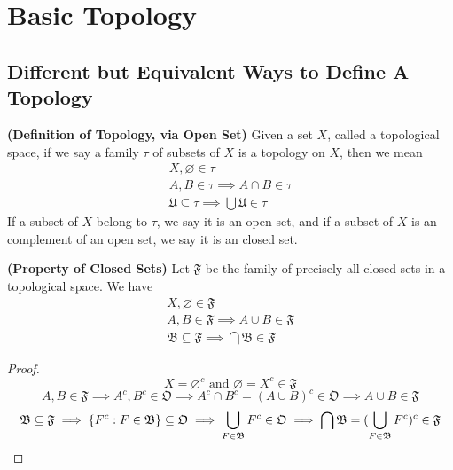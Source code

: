 \documentclass{report}
\begin{document}
\chapter{Basic Topology} 
\section{Different but Equivalent Ways to Define A Topology}
\begin{definition}
\label{2.1.1}
\textbf{(Definition of Topology, via Open Set)} Given a set $X$, called a topological space, if we say a family $\tau$  of subsets of $X$ is a topology on $X$, then we mean
\begin{gather}
X, \varnothing \in \tau\\
A,B\in\tau\implies A\cap B\in\tau\\
\mathfrak{U}\subseteq \tau\implies \bigcup \mathfrak{U}\in \tau
\end{gather}
If a subset of $X$ belong to  $\tau$, we say it is an open set, and if a subset of $X$ is an complement of an open set, we say it is an closed set.
\end{definition}
\begin{theorem}
\label{2.1.2}
\textbf{(Property of Closed Sets)} Let $\mathfrak{F}$ be the family of precisely all closed sets in a topological space. We have
\begin{gather}
X,\varnothing \in \mathfrak{F}\\
A,B\in\mathfrak{F}\implies A\cup  B\in\mathfrak{F}\\
\mathfrak{B}\subseteq \mathfrak{F}\implies \bigcap \mathfrak{B}\in \mathfrak{F}
\end{gather}
\end{theorem}
\begin{proof}
\begin{equation}
X=\varnothing^c\text{ and }\varnothing=X^c\in \mathfrak{F}
\end{equation}
\begin{equation}
A,B\in \mathfrak{F}\implies A^c,B^c \in \mathfrak{O}\implies A^c \cap B^c=(A\cup B)^c \in \mathfrak{O} \implies A\cup  B \in \mathfrak{F}
\end{equation}
\begin{equation}
\mathfrak{B}\subseteq \mathfrak{F}\implies \{ F^c:F \in \mathfrak{B} \}\subseteq \mathfrak{O}\implies \bigcup_{F\in \mathfrak{B}}F^c \in \mathfrak{O}\implies \bigcap \mathfrak{B}= (\bigcup_{F \in\mathfrak{B}} F^c)^c \in \mathfrak{F}
\end{equation}
\end{proof}
\end{document}
